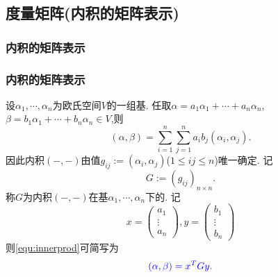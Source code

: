 \subsection{度量矩阵(内积的矩阵表示)}

\subsubsection{内积的矩阵表示}
\begin{frame}\frametitle{内积的矩阵表示}
\pp
设$\alpha_1,\cdots,\alpha_n$为欧氏空间$V$的一组基.
\pp
任取$\alpha = a_1\alpha_1+\cdots+a_n\alpha_n$, $\beta = b_1\alpha_1+\cdots+b_n\alpha_n\in V$,则
\begin{equation}\label{equ:innerprod}
(\alpha,\beta)=\sum_{i=1}^n\sum_{j=1}^n a_ib_j(\alpha_i,\alpha_j).
\end{equation}
\pp
因此内积$(-,-)$由值$g_{ij}:=(\alpha_i,\alpha_j)$($1\leq ij\leq n$)唯一确定.
\pp
记
\[G:=(g_{ij})_{n\times n}.\]
称$G$为内积$(-,-)$在基$\alpha_1,\cdots,\alpha_n$下的.
\pp
记
\[x=\begin{pmatrix}a_1\\\vdots\\a_n\end{pmatrix},y=\begin{pmatrix}b_1\\\vdots\\b_n\end{pmatrix}\]
则\eqref{equ:innerprod}可简写为
\[\blue{(\alpha,\beta)=x^TGy.}\]
\end{frame}


\renewcommand{\mydate}{2025年05月29日\ 二十五次课}



